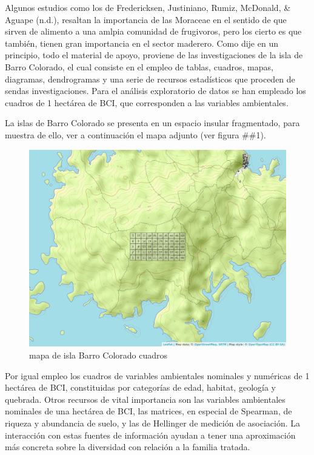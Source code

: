\documentclass[11pt,]{article}
\begin{document}
Algunos estudios como los de Fredericksen, Justiniano, Rumiz, McDonald,
\& Aguape (n.d.), resaltan la importancia de las Moraceae en el sentido
de que sirven de alimento a una amlpia comunidad de frugivoros, pero los
cierto es que también, tienen gran importancia en el sector maderero.
Como dije en un principio, todo el material de apoyo, proviene de las
investigaciones de la isla de Barro Colorado, el cual consiste en el
empleo de tablas, cuadros, mapas, diagramas, dendrogramas y una serie de
recursos estadísticos que proceden de sendas investigaciones. Para el
análisis exploratorio de datos se han empleado los cuadros de 1 hectárea
de BCI, que corresponden a las variables ambientales.

La islas de Barro Colorado se presenta en un espacio insular
fragmentado, para muestra de ello, ver a continuación el mapa adjunto
(ver figura \#\#1).

\begin{figure}
\centering
\includegraphics[width=1.00000\textwidth]{mapa_cuadros.png}
\caption{mapa de isla Barro Colorado cuadros\label{fig:bci_map}}
\end{figure}

Por igual empleo los cuadros de variables ambientales nominales y
numéricas de 1 hectárea de BCI, constituidas por categorías de edad,
habitat, geología y quebrada. Otros recursos de vital importancia son
las variables ambientales nominales de una hectárea de BCI, las
matrices, en especial de Spearman, de riqueza y abundancia de suelo, y
las de Hellinger de medición de asociación. La interacción con estas
fuentes de información ayudan a tener una aproximación más concreta
sobre la diversidad con relación a la familia tratada.
\end{document}
